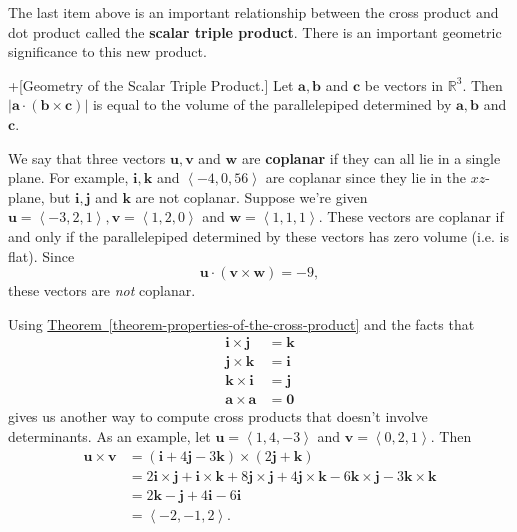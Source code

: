 \documentclass[10pt,]{book}
\newcommand{\terminology}[1]{\textbf{#1}}
\theoremstyle{ptxplainnotitle}
\theoremstyle{ptxplaintitle}
\theoremstyle{ptxplainnotitle}
\theoremstyle{ptxplaintitle}
\theoremstyle{ptxplainnotitle}
\theoremstyle{ptxplaintitle}
\theoremstyle{ptxdefinitionnotitle}
\theoremstyle{ptxdefinitiontitle}
\theoremstyle{ptxdefinitionnotitle}
\theoremstyle{ptxdefinitiontitle}
\theoremstyle{ptxdefinitionnotitle}
\theoremstyle{ptxdefinitiontitle}
\theoremstyle{ptxdefinitionnotitle}
\theoremstyle{ptxdefinitiontitle}
\theoremstyle{ptxdefinitionnotitle}
\theoremstyle{ptxdefinitiontitle}
\numberwithin{equation}{section}
\newcommand{\RR}{\mathbb{R}}
\newcommand{\vv}[1]{\mathbf{#1}}
\newcommand{\dotprod}[1]{\left\langle #1 \right\rangle}
\begin{document}
\hypertarget{p-842}{}%
The last item above is an important relationship between the cross product and dot product called the \terminology{scalar triple product}. There is an important geometric significance to this new product.%
\begin{theorem}+[{Geometry of the Scalar Triple Product.}]\label{theorem-geometry-of-the-scalar-triple-product}
\hypertarget{p-843}{}%
Let \(\vv{a},\vv{b}\) and \(\vv{c}\) be vectors in \(\RR^{3}\). Then \(|\vv{a}\cdot(\vv{b}\times\vv{c})|\) is equal to the volume of the parallelepiped determined by \(\vv{a},\vv{b}\) and \(\vv{c}\).%
\end{theorem}
\begin{example}\label{example-testing-if-vectors-are-coplanar}
\hypertarget{p-844}{}%
We say that three vectors \(\vv{u},\vv{v}\) and \(\vv{w}\) are \terminology{coplanar} if they can all lie in a single plane. For example, \(\vv{i},\vv{k}\) and \(\dotprod{-4,0,56}\) are coplanar since they lie in the \(xz\)-plane, but \(\vv{i},\vv{j}\) and \(\vv{k}\) are not coplanar. Suppose we're given \(\vv{u} = \dotprod{-3,2,1},\vv{v} = \dotprod{1,2,0}\) and \(\vv{w} = \dotprod{1,1,1}\). These vectors are coplanar if and only if the parallelepiped determined by these vectors has zero volume (i.e. is flat). Since%
%
\begin{equation*}
\vv{u}\cdot(\vv{v}\times\vv{w}) = -9,
\end{equation*}
\hypertarget{p-845}{}%
these vectors are \emph{not} coplanar.%
\end{example}
\begin{example}\label{example-another-way-to-compute-cross-products}
\hypertarget{p-846}{}%
Using \hyperref[theorem-properties-of-the-cross-product]{Theorem~\ref{theorem-properties-of-the-cross-product}} and the facts that%
%
\begin{align*}
\vv{i}\times\vv{j} & = \vv{k} \\
\vv{j}\times\vv{k} & = \vv{i} \\
\vv{k}\times\vv{i} & = \vv{j} \\
\vv{a}\times\vv{a} & = \vv{0} 
\end{align*}
\hypertarget{p-847}{}%
gives us another way to compute cross products that doesn't involve determinants. As an example, let \(\vv{u} = \dotprod{1,4,-3}\) and \(\vv{v} = \dotprod{0,2,1}.\) Then%
%
\begin{align*}
\vv{u}\times\vv{v} & = (\vv{i}+4\vv{j}-3\vv{k})\times(2\vv{j}+\vv{k}) \\
& = 2\vv{i}\times\vv{j} + \vv{i}\times\vv{k} +8\vv{j}\times\vv{j} + 4\vv{j}\times\vv{k} - 6\vv{k}\times\vv{j} -3\vv{k}\times\vv{k} \\
& = 2\vv{k}-\vv{j}+4\vv{i}-6\vv{i} \\
& = \dotprod{-2,-1,2}. 
\end{align*}
\end{example}
\typeout{************************************************}
\typeout{************************************************}
\end{document}
